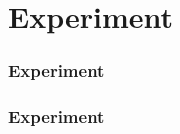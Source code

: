 \section{Experiment}

\begin{frame}
  \frametitle{Experiment}
\end{frame}

\begin{frame}
  \frametitle{Experiment}
\end{frame}

